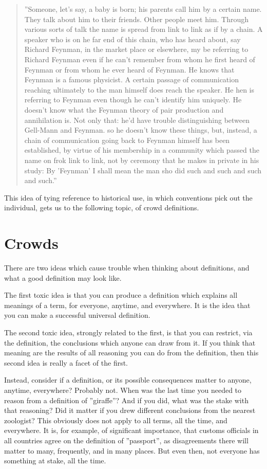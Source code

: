 \begin{quote}
''Someone, let's say, a baby is born; his parents call him by a certain name. They talk about him to their friends. Other people meet him. Through various sorts of talk the name is spread from link to link as if by a chain. A speaker who is on he far end of this chain, who has heard about, say Richard Feynman, in the market place or elsewhere, my be referring to Richard Feynman even if he can't remember from whom he first heard of Feynman or from whom he ever heard of Feynman. He knows that Feynman is a famous physicist. A certain passage of communication reaching ultimately to the man himself does reach the speaker. He hen is referring to Feynman even though he can't identify him uniquely. He doesn't know what the Feynman theory of pair production and annihilation is. Not only that: he'd have trouble distinguishing between Gell-Mann and Feynman. so he doesn't know these things, but, instead, a chain of communication going back to Feynman himself has been established, by virtue of his membership in a community which passed the name on frok link to link, not by ceremony that he makes in private in his study: By 'Feynman' I shall mean the man sho did such and such and such and such.'' \cite{kripke1972naming}
\end{quote}

This idea of tying reference to historical use, in which conventions pick out the individual, gets us to the following topic, of crowd definitions.


\section{Crowds}
\label{c4:s6}
There are two ideas which cause trouble when thinking about definitions, and what a good definition may look like.

The first toxic idea is that you can produce a definition which explains all meanings of a term, for everyone, anytime, and everywhere. It is the idea that you can make a successful universal definition.

The second toxic idea, strongly related to the first, is that you can restrict, via the definition, the conclusions which anyone can draw from it. If you think that meaning are the results of all reasoning you can do from the definition, then this second idea is really a facet of the first.

Instead, consider if a definition, or its possible consequences matter to anyone, anytime, everywhere? Probably not. When was the last time you needed to reason from a definition of ''giraffe''? And if you did, what was the stake with that reasoning? Did it matter if you drew different conclusions from the nearest zoologist? This obviously does not apply to all terms, all the time, and everywhere. It is, for example, of significant importance, that customs officials in all countries agree on the definition of ''passport'', as disagreements there will matter to many, frequently, and in many places. But even then, not everyone has something at stake, all the time. 

